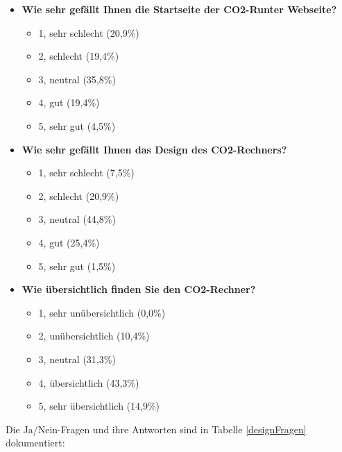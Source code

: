 \begin{itemize}
    \item \textbf{Wie sehr gefällt Ihnen die Startseite der CO2-Runter Webseite?}
          \begin{itemize}
              \item 1, sehr schlecht (20,9\%)
              \item 2, schlecht (19,4\%)
              \item 3, neutral (35,8\%)
              \item 4, gut (19,4\%)
              \item 5, sehr gut (4,5\%)
          \end{itemize}
    \item \textbf{Wie sehr gefällt Ihnen das Design des CO2-Rechners?}
          \begin{itemize}
              \item 1, sehr schlecht (7,5\%)
              \item 2, schlecht (20,9\%)
              \item 3, neutral (44,8\%)
              \item 4, gut (25,4\%)
              \item 5, sehr gut (1,5\%)
          \end{itemize}
    \item \textbf{Wie übersichtlich finden Sie den CO2-Rechner?}
          \begin{itemize}
              \item 1, sehr unübersichtlich (0,0\%)
              \item 2, unübersichtlich (10,4\%)
              \item 3, neutral (31,3\%)
              \item 4, übersichtlich (43,3\%)
              \item 5, sehr übersichtlich (14,9\%)
          \end{itemize}
\end{itemize}

Die Ja/Nein-Fragen und ihre Antworten sind in Tabelle \ref{designFragen} dokumentiert:

